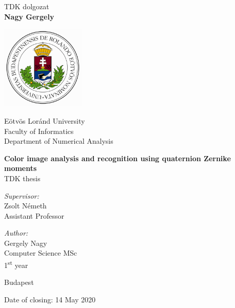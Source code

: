 \documentclass[runningheads,a4paper,11pt]{report}
\begin{document}
\thispagestyle{empty}
\begin{center}
{\Huge TDK dolgozat}\\[0.5cm]
{\bf Nagy Gergely} \\[1cm]
\end{center}


\begin{titlepage}
  \noindent
  \begin{minipage}{0.25 \textwidth}
    \includegraphics[height=40mm]{figures/cimer.png}
  \end{minipage}
  \hfill
  \begin{minipage}{0.67 \textwidth}
    \large
    Eötvös Loránd University \\
    Faculty of Informatics \\
    Department of Numerical Analysis \\
    
  \end{minipage}

  \vfill

  \begin{center}
    {\LARGE \bfseries Color image analysis and recognition using quaternion Zernike moments} 
    \\[2.0cm]
    {\Large TDK thesis}
    \\[3cm]
    \begin{minipage}[t]{0.45 \textwidth}
      \emph{Supervisor:} \\[0.25 \baselineskip]
      {\large Zsolt Németh} \\[0.5 \baselineskip]
      Assistant Professor
    \end{minipage}
    \begin{minipage}[t]{0.45 \textwidth}
      \begin{flushright}
        \emph{Author:} \\[0.25 \baselineskip]
        {\large Gergely Nagy} \\[0.5 \baselineskip]
        Computer Science MSc \\ %
        1\textsuperscript{st} year
      \end{flushright}
    \end{minipage}
  \end{center}

  \vfill

  \begin{center}
    \large Budapest

    \large Date of closing: 14 May 2020
  \end{center}
\end{titlepage}
\end{document}
